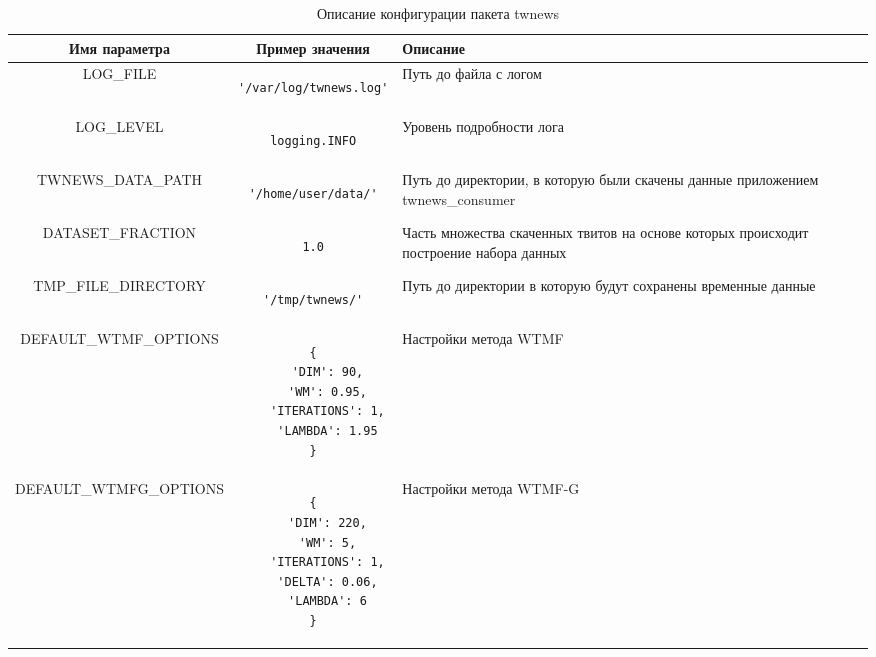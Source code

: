         \begin{table}[h!]
            \small
            \caption{Описание конфигурации пакета twnews \bigskip}
            \center

            \label{tabular:core_config}
            \begin{tabular}{|c|c|m{4.8cm}|}
                \hline
                \bf{Имя параметра} & \bf{Пример значения} & \bf{Описание} \\ \hline

                LOG\_FILE & \begin{lstlisting}[basicstyle=\small]
'/var/log/twnews.log'
                \end{lstlisting} & Путь до файла с логом \\ \hline

                LOG\_LEVEL & \begin{lstlisting}[basicstyle=\small]
logging.INFO
                \end{lstlisting} & Уровень подробности лога \\ \hline

                TWNEWS\_DATA\_PATH & \begin{lstlisting}[basicstyle=\small]
'/home/user/data/'
                \end{lstlisting} & Путь до директории, в которую были скачены данные приложением twnews\_consumer \\ \hline

                DATASET\_FRACTION & \begin{lstlisting}[basicstyle=\small]
1.0
\end{lstlisting} & Часть множества скаченных твитов на основе которых происходит построение набора данных \\ \hline

                TMP\_FILE\_DIRECTORY & \begin{lstlisting}[basicstyle=\small]
'/tmp/twnews/'
                \end{lstlisting} & Путь до директории в которую будут сохранены временные данные \\ \hline

                 DEFAULT\_WTMF\_OPTIONS & \begin{lstlisting}[basicstyle=\small]
{
    'DIM': 90,
    'WM': 0.95,
    'ITERATIONS': 1,
    'LAMBDA': 1.95
}
                \end{lstlisting} & Настройки метода WTMF \\ \hline

                 DEFAULT\_WTMFG\_OPTIONS & \begin{lstlisting}[basicstyle=\small]
{
    'DIM': 220,
    'WM': 5,
    'ITERATIONS': 1,
    'DELTA': 0.06,
    'LAMBDA': 6
}
                \end{lstlisting} & Настройки метода WTMF-G \\ \hline

            \end{tabular}
        \end{table}

